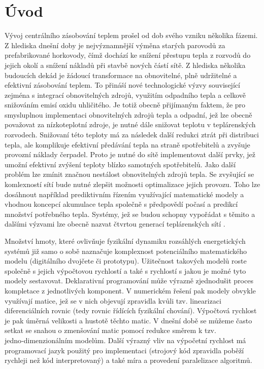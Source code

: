 \chapter{Úvod}
Vývoj centrálního zásobování teplem prošel od dob svého vzniku několika fázemi.
Z hlediska dnešní doby je nejvýznamnější výměna starých parovodů za
prefabrikované horkovody, čímž dochází ke snížení přestupu tepla z rozvodů do
jejich okolí a snížení nákladů při stavbě nových částí sítě. Z hlediska
několika budoucích dekád je žádoucí transformace na obnovitelné, plně
udržitelné a efektivní zásobování teplem. To přináší nové technologické výzvy
související zejména s integrací obnovitelných zdrojů, využitím odpadního tepla
a celkově snižováním emisí oxidu uhličitého. Je totiž obecně přijímaným faktem,
že pro smysluplnou implementaci obnovitelných zdrojů tepla a odpadní, jež lze
obecně považovat za nízkoteplotní zdroje, je nutné dále snižovat
teplotu v teplárenských rozvodech. Snižovaní této teploty má za následek další
redukci ztrát při distribuci tepla, ale komplikuje efektivní předávání tepla na
straně spotřebitelů a zvyšuje provozní náklady čerpadel. Proto je nutné do sítě
implementovat další prvky, jež umožní efektivní zvýšení teploty blízko
samotných spotřebitelů. Jako další problém lze zmínit značnou nestálost
obnovitelných zdrojů tepla. Se zvyšující se komlexností sítí bude nutné zlepšit
možnosti optimalizace jejich provozu. Toho lze dosáhnout například prediktivním
řízením využívající matematické modely a vhodnou koncepcí akumulace tepla
společně s předpovědí počasí a predikcí množství potřebného tepla. Systémy, jež
se budou schopny vypořádat s těmito a dalšími výzvami lze obecně nazvat čtvrtou
generací teplárenských sítí \cite{Lund2014}.

Množství hmoty, které ovlivňuje fyzikální dynamiku rozsáhlých energetických
systémů již samo o sobě naznačuje komplexnost potenciálního matematického
modelu (digitálního dvojčete či prototypu). Užitečnost takových modelů roste
společně s jejich výpočtovou rychlostí a také s rychlostí s jakou je možné tyto
modely sestavovat. Deklarativní programování může výrazně zjednodušit proces
kompletace z jednotlivých komponent. V numerickém řešení pak modely obvykle
využívají matice, jež se v nich objevují zpravidla kvůli tzv. linearizaci
diferenciálních rovnic (tedy rovnic řídících fyzikální chování). Výpočtová
rychlost je pak úměrná velikosti a hustotě těchto matic. V dnešní době se
můžeme často setkat se snahou o zmenšování matic pomocí redukce směrem k tzv.
jedno‑dimenzionálním modelům. Další výrazný vliv na výpočetní rychlost má
programovací jazyk použitý pro implementaci (strojový kód zpravidla poběží
rychleji než kód interpretovaný) a také míra a provedení paralelizace
algoritmů.

